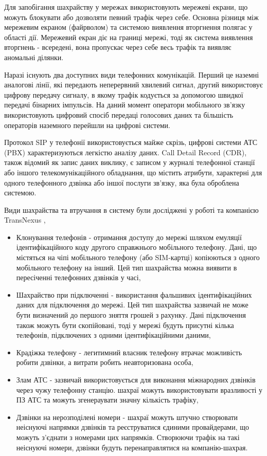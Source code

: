   Для запобігання шахрайству у мережах використовують мережеві екрани, що можуть блокувати або дозволяти певний трафік через себе.
  Основна різниця між мережевим екраном (файрволом) та системою виявлення вторгнення полягає у області дії. Мережевий екран діє на границі мережі, тоді як система виявлення вторгнень - всередені, вона пропускає через себе весь трафік та виявляє аномальні ділянки.

  Наразі існують два доступних види телефонних комунікацій. Перший це наземні аналогові лінії, які передають неперервний хвилевий сигнал, другий використовує цифрову передачу сигналу, в якому трафік кодується за допомогою швидкої передачі бінарних імпульсів. На даний момент оператори мобільного зв'язку використовують цифровий спосіб передаці голосових даних та більшість операторів наземного перейшли на цифрові системи.

  Протокол SIP у телефонії використовується майже скрізь, цифрові системи АТС (PBX) характеризуються легкістю аналізу даних. Call Detail Record (CDR), також відомий як запис даних виклику, є записом у журналі телефонної станції або іншого телекомунікаційного обладнання, що містить атрибути, характерні для одного телефонного дзвінка або іншої послуги зв'язку, яка була оброблена системою.

  Види шахрайства та втручання в систему були досліджені у роботі \cite{barson1996detection} та компанією TransNexus \cite{transnexus2012voipfraud},

\begin{itemize}
  \item Клонування телефонів - отримання доступу до мережі шляхом емуляції ідентифікаційного коду
другого справжнього мобільного телефону. Дані, що містяться на чіпі мобільного телефону (або SIM-картці) копіюються з одного мобільного телефону на інший. Цей тип шахрайства можна виявити в пересіченні телефонних дзвінків у часі,
  \item Шахрайство при підключенні - використання фальшивих ідентифікаційних даних для підключення до мережі. Цей тип шахрайства зазвичай не може бути визначений до першого зняття грошей з рахунку. Дані підключення також можуть бути скопійовані, тоді у мережі будуть присутні кілька телефонів, підключених з одними ідентифікаційними даними,
  \item Крадіжка телефону - легитимний власник телефону втрачає можливість робити дзвінки, а витрати робить неавторизована особа,
  \item Злам АТС - зазвичай використовується для виконання міжнародних дзвінків через чужу телефонну станцію. шахраї можуть використовувати вразливості у ПЗ АТС та можуть згенераувати значну кількість трафіку,
  \item Дзвінки на нерозподілені номери - шахраї можуть штучно створювати неіснуючі напрямки дзвінків та реєструватися єдиними провайдерами, що можуть з'єднати з номерами цих напрямків. Створюючи трафік на такі неіснуючі номери, дзвінки будуть перенаправлятися на компанію-шахрая.
\end{itemize}

